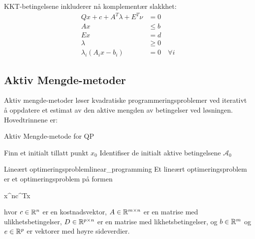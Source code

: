 KKT-betingelsene inkluderer nå komplementær slakkhet:
\begin{align*}
	Qx + c + A^T\lambda + E^T\nu & = 0                 \\
	Ax                           & \leq b              \\
	Ex                           & = d                 \\
	\lambda                      & \geq 0              \\
	\lambda_i(A_ix - b_i)        & = 0 \quad \forall i
\end{align*}

\subsection{Aktiv Mengde-metoder}
Aktiv mengde-metoder løser kvadratiske programmeringsproblemer ved iterativt å oppdatere et estimat av den aktive mengden av betingelser ved løsningen. Hovedtrinnene er:

\begin{algorithm}[H]
	\caption{Aktiv Mengde-metode for QP}
	Finn et initialt tillatt punkt \( x_0 \)\;
	Identifiser de initialt aktive betingelsene \( \mathcal{A}_0 \)\;
\end{algorithm}

\begin{definition}{Lineært optimeringsproblem}{linear_programming}
	Et lineært optimeringsproblem er et optimeringsproblem på formen
	\begin{mini*}
		{x\in\R^n}{c^Tx}{}{}
	\end{mini*}
	hvor \(c \in \mathbb{R}^n\) er en kostnadsvektor, \(A \in \mathbb{R}^{m \times n}\) er en matrise med ulikhetsbetingelser, \(D \in \mathbb{R}^{p \times n}\) er en matrise med likhetsbetingelser, og \(b \in \mathbb{R}^m\) og \(e \in \mathbb{R}^p\) er vektorer med høyre sideverdier.
\end{definition}

